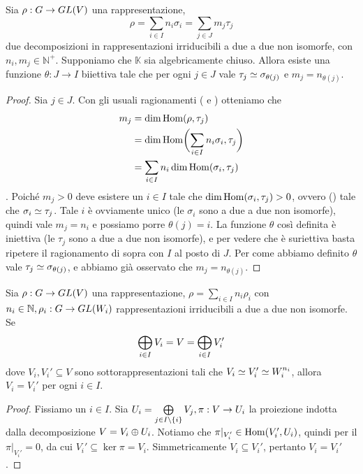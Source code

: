 \begin{proposition}
Sia $\rho:G\to GL(V)$ una rappresentazione,
$$
\rho=\sum_{i\in I}n_i\sigma_i=\sum_{j\in J}m_j\tau_j
$$
due decomposizioni in rappresentazioni irriducibili a due a due non isomorfe, con $n_i\comma m_j\in\mathbb{N}^+$. Supponiamo che $\mathbb{K}$ sia algebricamente chiuso. Allora esiste una funzione $\theta:J\to I$ biiettiva tale che per ogni $j\in J$ vale $\tau_j\simeq\sigma_{\theta(j)}$ e $m_j=n_{\theta(j)}$.
\end{proposition}
\begin{proof}
Sia $j\in J$. Con gli usuali ragionamenti ( e ) otteniamo che
\begin{align*}
m_j&=\dim\operatorname{Hom}(\rho,\tau_j)\\
&=\dim\operatorname{Hom}\biggl(\sum_{i\in I}n_i\sigma_i,\tau_j\biggr)\\
&=\sum_{i\in I}n_i\dim\operatorname{Hom}(\sigma_i,\tau_j)
\end{align*}
. Poiché $m_j>0$ deve esistere un $i\in I$ tale che $\dim\operatorname{Hom}(\sigma_i,\tau_j)>0$, ovvero () tale che $\sigma_i\simeq\tau_j$. Tale $i$ è ovviamente unico (le $\sigma_i$ sono a due a due non isomorfe), quindi vale $m_j=n_i$ e possiamo porre $\theta(j)=i$. La funzione $\theta$ così definita è iniettiva (le $\tau_j$ sono a due a due non isomorfe), e per vedere che è suriettiva basta ripetere il ragionamento di sopra con $I$ al posto di $J$. Per come abbiamo definito $\theta$ vale $\tau_j\simeq\sigma_{\theta(j)}$, e abbiamo già osservato che $m_j=n_{\theta(j)}$.
\end{proof}

\begin{proposition}
Sia $\rho:G\to GL(V)$ una rappresentazione, $\rho=\sum_{i\in I}n_i\rho_i$ con $n_i\in\mathbb{N},\allowbreak\rho_i:G\to GL(W_i)$ rappresentazioni irriducibili a due a due non isomorfe. Se
$$
\bigoplus_{i\in I}V_i=V=\bigoplus_{i\in I}V_i'
$$
dove $V_i\comma V_i'\subseteq V$ sono sottorappresentazioni tali che $V_i\simeq V_i'\simeq W_i^{n_i}$, allora $V_i=V_i'$ per ogni $i\in I$.
\end{proposition}
\begin{proof}
Fissiamo un $i\in I$. Sia $U_i=\bigoplus\limits_{j\in I\setminus\{i\}}V_j,\allowbreak\pi:V\to U_i$ la proiezione indotta dalla decomposizione $V=V_i\oplus U_i$. Notiamo che $\pi|_{V_i'}\in\operatorname{Hom}(V_i',U_i)$, quindi per il  $\pi|_{V_i'}=0$, da cui $V_i'\subseteq\ker\pi=V_i$. Simmetricamente $V_i\subseteq V_i'$, pertanto $V_i=V_i'$.
\end{proof}

